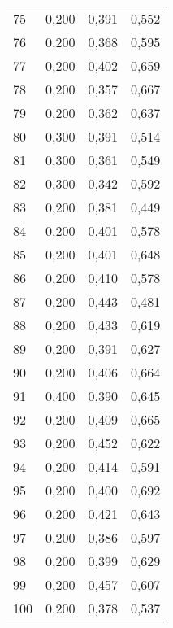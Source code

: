 \begin{longtable}{|l|l|l|l|}
        75&0,200&0,391&0,552\\
        76&0,200&0,368&0,595\\
        77&0,200&0,402&0,659\\
        78&0,200&0,357&0,667\\
        79&0,200&0,362&0,637\\
        80&0,300&0,391&0,514\\
        81&0,300&0,361&0,549\\
        82&0,300&0,342&0,592\\
        83&0,200&0,381&0,449\\
        84&0,200&0,401&0,578\\
        85&0,200&0,401&0,648\\
        86&0,200&0,410&0,578\\
        87&0,200&0,443&0,481\\
        88&0,200&0,433&0,619\\
        89&0,200&0,391&0,627\\
        90&0,200&0,406&0,664\\
        91&0,400&0,390&0,645\\
        92&0,200&0,409&0,665\\
        93&0,200&0,452&0,622\\
        94&0,200&0,414&0,591\\
        95&0,200&0,400&0,692\\
        96&0,200&0,421&0,643\\
        97&0,200&0,386&0,597\\
        98&0,200&0,399&0,629\\
        99&0,200&0,457&0,607\\
        100&0,200&0,378&0,537\\
\end{longtable}

